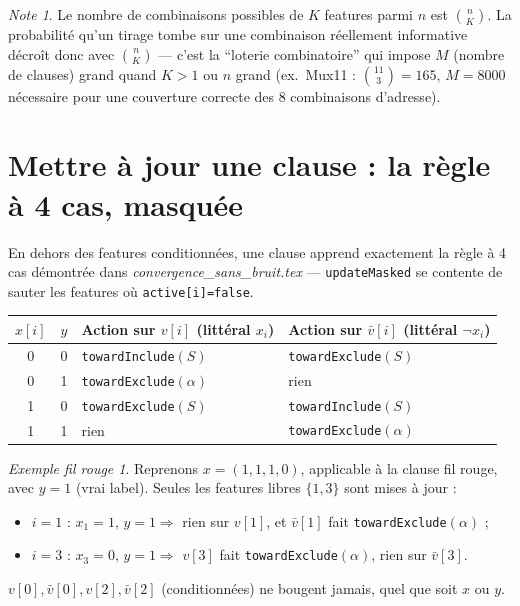 \documentclass[12pt,a4paper]{article}
\newcommand{\vbar}{\bar{v}}
\newcommand{\code}[1]{\texttt{#1}}
\theoremstyle{remark}
\newtheorem{note}{Note}[section]
\newtheorem{exemple}{Exemple fil rouge}[section]
\begin{document}
\begin{note}
Le nombre de combinaisons possibles de $K$ features parmi $n$ est
$\binom{n}{K}$. La probabilité qu'un tirage tombe sur une combinaison
réellement informative décroît donc avec $\binom{n}{K}$ --- c'est la
``loterie combinatoire'' qui impose $M$ (nombre de clauses) grand quand $K>1$
ou $n$ grand (ex.\ Mux11 : $\binom{11}{3}=165$, $M=8000$ nécessaire pour une
couverture correcte des $8$ combinaisons d'adresse).
\end{note}

\section{Mettre à jour une clause : la règle à 4 cas, masquée}\label{sec:update}

En dehors des features conditionnées, une clause apprend exactement la règle
à 4 cas démontrée dans \emph{convergence\_sans\_bruit.tex} ---
\code{updateMasked} se contente de sauter les features où
\code{active[i]=false}.

\begin{center}
\renewcommand{\arraystretch}{1.4}
\begin{tabular}{ccll}
\toprule
$x[i]$ & $y$ & Action sur $v[i]$ (littéral $x_i$) & Action sur $\vbar[i]$ (littéral $\neg x_i$) \\
\midrule
0 & 0 & \code{towardInclude}$(S)$   & \code{towardExclude}$(S)$ \\
0 & 1 & \code{towardExclude}$(\alpha)$ & rien \\
1 & 0 & \code{towardExclude}$(S)$   & \code{towardInclude}$(S)$ \\
1 & 1 & rien                      & \code{towardExclude}$(\alpha)$ \\
\bottomrule
\end{tabular}
\end{center}

\begin{exemple}
Reprenons $x=(1,1,1,0)$, applicable à la clause fil rouge, avec $y=1$ (vrai
label). Seules les features libres $\{1,3\}$ sont mises à jour :
\begin{itemize}
  \item $i=1$ : $x_1{=}1,\,y{=}1 \Rightarrow$ rien sur $v[1]$, et
        $\vbar[1]$ fait \code{towardExclude}$(\alpha)$ ;
  \item $i=3$ : $x_3{=}0,\,y{=}1 \Rightarrow$ $v[3]$ fait
        \code{towardExclude}$(\alpha)$, rien sur $\vbar[3]$.
\end{itemize}
$v[0],\vbar[0],v[2],\vbar[2]$ (conditionnées) ne bougent jamais, quel que soit
$x$ ou $y$.
\end{exemple}
\end{document}
